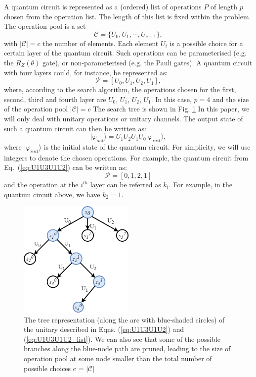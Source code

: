 \documentclass[a4paper,onecolumn,11pt]{quantumarticle}
\begin{document}
A quantum circuit is represented as a (ordered) list of operations $P$ of length $p$ chosen from the operation list. The length of this list is fixed within the problem.
The operation pool is a set 
\begin{equation}
\mathcal{C} = \{U_0, U_1, \cdots, U_{c-1} \},
\end{equation}
with $\vert \mathcal{C} \vert = c$ the number of elements. Each element $U_i$ is a possible choice for a certain layer of the quantum circuit. Such operations can be parameterised (e.g. the $R_Z(\theta)$ gate), or non-parameterised (e.g. the Pauli gates). A quantum circuit with four layers could, for instance, be represented as:
\begin{equation}
    \mathcal{P} = [U_0, U_1, U_2, U_1],
\end{equation}
where, according to the search algorithm, the operations chosen for the first, second, third and fourth layer are $U_0$, $U_1$, $U_2$, $U_1$. In this case, $p=4$ and the size of the operation pool $\vert \mathcal{C} \vert = c$ The search tree is shown in Fig. \ref{fig:treeexample} In this paper, we will only deal with unitary operations or unitary channels. The output state of such a quantum circuit can then be written as:
\begin{equation}
    \vert\varphi_{out}\rangle = U_1 U_2 U_1 U_0 \vert\varphi_{init}\rangle\label{eq:U1U3U1U2},
\end{equation}
where $\vert \varphi_{init}\rangle$ is the initial state of the quantum circuit. For simplicity, we will use integers to denote the chosen operations. For example, the  quantum circuit from Eq.~(\ref{eq:U1U3U1U2}) can be written as:
\begin{equation}
    \mathcal{P} = [0, 1, 2, 1]\label{eq:U1U3U1U2_list}
\end{equation}
and the operation at the $i^{th}$ layer can be referred as $k_i$. For example, in the quantum circuit above, we have $k_2=1$.

\begin{figure}[H]
  \centering
  \includegraphics[width=0.5\textwidth]{Figures/tree_example.png}
  \caption{The tree representation (along the arc with blue-shaded circles) of the unitary described in Eqns. (\ref{eq:U1U3U1U2}) and (\ref{eq:U1U3U1U2_list}). We can also see that some of the possible branches along the blue-node path are pruned, leading to the size of operation pool at some node smaller than the total number of possible choices c = $\vert \mathcal{C}\vert$}
  \label{fig:treeexample}
\end{figure}
\end{document}
